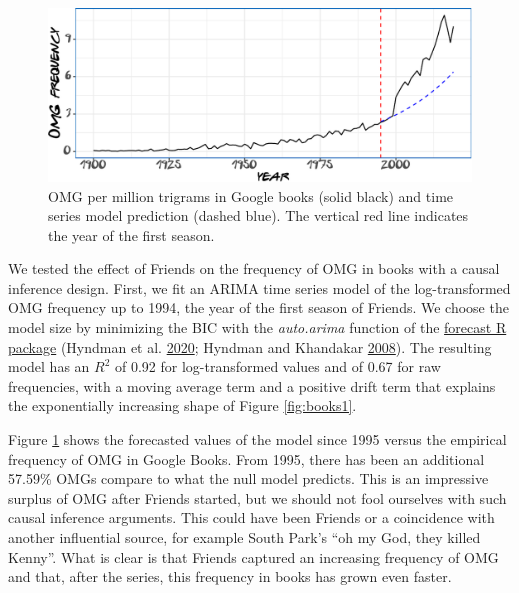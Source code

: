 \documentclass[]{article}
\begin{document}
\begin{figure}

{\centering \includegraphics{Friends_HPS_pdf_files/figure-latex/books2-1} 

}

\caption{OMG per million trigrams in Google books (solid black) and time series model prediction (dashed blue). The vertical red line indicates the year of the first season.}\label{fig:books2}
\end{figure}

We tested the effect of Friends on the frequency of OMG in books with a causal inference design. First, we fit an ARIMA time series model of the log-transformed OMG frequency up to 1994, the year of the first season of Friends. We choose the model size by minimizing the BIC with the \emph{auto.arima} function of the \href{https://cran.r-project.org/web/packages/forecast/index.html}{forecast R package} (Hyndman et al. \protect\hyperlink{ref-forecast1}{2020}; Hyndman and Khandakar \protect\hyperlink{ref-forecast2}{2008}). The resulting model has an \(R^2\) of 0.92
for log-transformed values and of 0.67 for raw frequencies, with a moving average term and a positive drift term that explains the exponentially increasing shape of Figure \ref{fig:books1}.

\newpage

Figure \ref{fig:books2} shows the forecasted values of the model since 1995 versus the empirical frequency of OMG in Google Books.
From 1995, there has been an additional 57.59\% OMGs compare to what the null model predicts.
This is an impressive surplus of OMG after Friends started, but we should not fool ourselves with such causal inference arguments.
This could have been Friends or a coincidence with another influential source, for example South Park's ``oh my God, they killed Kenny''. What is clear is that Friends captured an increasing frequency of OMG and that, after the series, this frequency in books has grown even faster.
\end{document}
